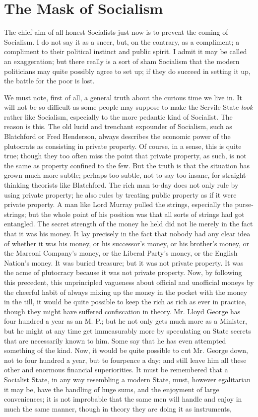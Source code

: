 \documentclass{book}
\begin{document}
\chapter{The Mask of Socialism}
\label{chapter-8}
The chief aim of all honest Socialists just now is to prevent the coming of Socialism. I do not say it as a sneer, but, on the contrary, as a compliment; a compliment to their political instinct and public spirit. I admit it may be called an exaggeration; but there really is a sort of sham Socialism that the modern politicians may quite possibly agree to set up; if they do succeed in setting it up, the battle for the poor is lost.

We must note, first of all, a general truth about the curious time we live in. It will not be so difficult as some people may suppose to make the Servile State \emph{look} rather like Socialism, especially to the more pedantic kind of Socialist. The reason is this. The old lucid and trenchant expounder of Socialism, such as Blatchford or Fred Henderson, always describes the economic power of the plutocrats as consisting in private property. Of course, in a sense, this is quite true; though they too often miss the point that private property, as such, is not the same as property confined to the few. But the truth is that the situation has grown much more subtle; perhaps too subtle, not to say too insane, for straight-thinking theorists like Blatchford. The rich man to-day does not only rule by using private property; he also rules by treating public property as if it were private property. A man like Lord Murray pulled the strings, especially the purse-strings; but the whole point of his position was that all sorts of strings had got entangled. The secret strength of the money he held did not lie merely in the fact that it was his money. It lay precisely in the fact that nobody had any clear idea of whether it was his money, or his successor’s money, or his brother’s money, or the Marconi Company’s money, or the Liberal Party’s money, or the English Nation’s money. It was buried treasure; but it was not private property. It was the acme of plutocracy because it was not private property. Now, by following this precedent, this unprincipled vagueness about official and unofficial moneys by the cheerful habit of always mixing up the money in the pocket with the money in the till, it would be quite possible to keep the rich as rich as ever in practice, though they might have suffered confiscation in theory. Mr. Lloyd George has four hundred a year as an M. P.; but he not only gets much more as a Minister, but he might at any time get immeasurably more by speculating on State secrets that are necessarily known to him. Some say that he has even attempted something of the kind. Now, it would be quite possible to cut Mr. George down, not to four hundred a year, but to fourpence a day; and still leave him all these other and enormous financial superiorities. It must be remembered that a Socialist State, in any way resembling a modern State, must, however egalitarian it may be, have the handling of huge sums, and the enjoyment of large conveniences; it is not improbable that the same men will handle and enjoy in much the same manner, though in theory they are doing it as instruments, 
\end{document}

